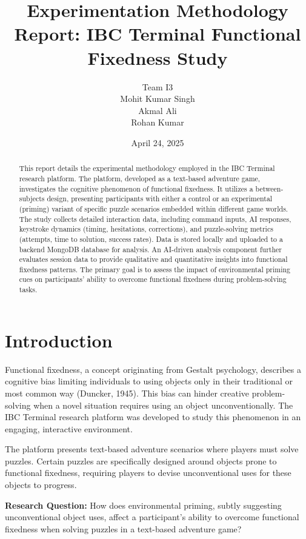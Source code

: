 \documentclass{article}
\title{Experimentation Methodology Report: IBC Terminal Functional Fixedness Study}
\author{
    Team I3 \\
    Mohit Kumar Singh \\
    Akmal Ali \\
    Rohan Kumar
}
\date{April 24, 2025}
\begin{document}
\maketitle

\begin{abstract}
This report details the experimental methodology employed in the IBC Terminal research platform. The platform, developed as a text-based adventure game, investigates the cognitive phenomenon of functional fixedness. It utilizes a between-subjects design, presenting participants with either a control or an experimental (priming) variant of specific puzzle scenarios embedded within different game worlds. The study collects detailed interaction data, including command inputs, AI responses, keystroke dynamics (timing, hesitations, corrections), and puzzle-solving metrics (attempts, time to solution, success rates). Data is stored locally and uploaded to a backend MongoDB database for analysis. An AI-driven analysis component further evaluates session data to provide qualitative and quantitative insights into functional fixedness patterns. The primary goal is to assess the impact of environmental priming cues on participants' ability to overcome functional fixedness during problem-solving tasks.
\end{abstract}

\section{Introduction}

Functional fixedness, a concept originating from Gestalt psychology, describes a cognitive bias limiting individuals to using objects only in their traditional or most common way (Duncker, 1945). This bias can hinder creative problem-solving when a novel situation requires using an object unconventionally. The IBC Terminal research platform was developed to study this phenomenon in an engaging, interactive environment.

The platform presents text-based adventure scenarios where players must solve puzzles. Certain puzzles are specifically designed around objects prone to functional fixedness, requiring players to devise unconventional uses for these objects to progress.

\textbf{Research Question:} How does environmental priming, subtly suggesting unconventional object uses, affect a participant's ability to overcome functional fixedness when solving puzzles in a text-based adventure game?
\end{document}
